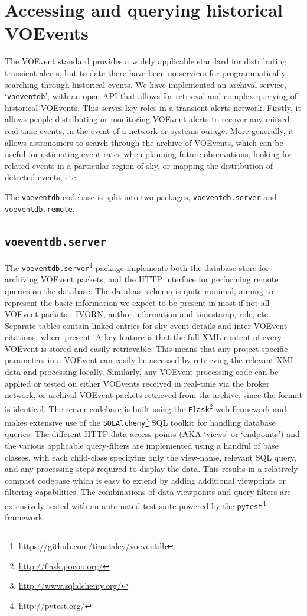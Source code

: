 \documentclass[5p,authoryear]{elsarticle}
\begin{document}
\section{Accessing and querying historical VOEvents}
The VOEvent standard provides a widely applicable standard for distributing transient alerts, but to date there have been no services for programmatically searching through historical events.
We have implemented an archival service, `\texttt{voeventdb}', with an open API that allows for retrieval and complex querying of historical VOEvents. 
This serves key roles in a transient alerts network. 
Firstly, it allows people distributing or monitoring VOEvent alerts to recover any missed real-time events, in the event of a network or systems outage. 
More generally, it allows astronomers to search through the archive of VOEvents, which can be useful for estimating event rates when planning future observations, looking for related events in a particular region of sky, or mapping the distribution of detected events, etc.

The \texttt{voeventdb} codebase is split into two packages, \texttt{voeventdb.server} and \texttt{voeventdb.remote}.

\subsection{\texttt{voeventdb.server}}
The \texttt{voeventdb.server}\footnote{\url{https://github.com/timstaley/voeventdb}}
package implements both the database store for archiving VOEvent packets, and the HTTP interface for performing remote queries on the database. 
The database schema is quite minimal, aiming to represent the basic information we expect to be present in most if not all VOEvent packets - IVORN, author information and timestamp, role, etc. 
Separate tables contain linked entries for sky-event details and inter-VOEvent citations, where present. 
A key feature is that the full XML content of every VOEvent is stored and easily retrievable. 
This means that any project-specific parameters in a VOEvent can easily be accessed by retrieving the relevant XML data and processing locally. 
Similarly, any VOEvent processing code can be applied or tested on either VOEvents received in real-time via the broker network, or archival VOEvent packets retrieved from the archive, since the format is identical.
The server codebase is built using the \texttt{Flask}\footnote{\url{http://flask.pocoo.org/}} web framework and makes extensive use of the \texttt{SQLAlchemy}\footnote{\url{http://www.sqlalchemy.org/}} SQL toolkit for handling database queries. 
The different HTTP data access points (AKA `views' or `endpoints') and the various applicable query-filters are implemented using a handful of base classes, with each child-class specifying only the view-name, relevant SQL query, and any processing steps required to display the data. 
This results in a relatively compact codebase which is easy to extend by adding additional viewpoints or filtering capabilities.
The combinations of data-viewpoints and query-filters are extensively tested with an automated test-suite powered by the \texttt{pytest}\footnote{\url{http://pytest.org/}} framework.
\end{document}
